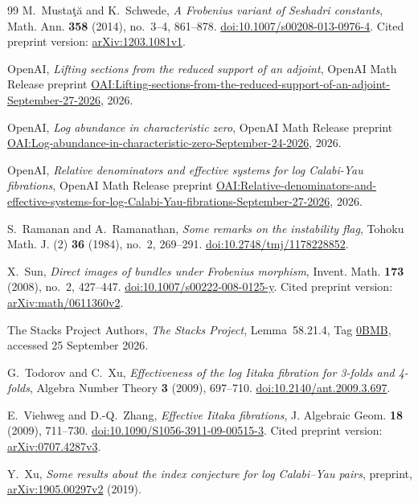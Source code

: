 \begin{thebibliography}{99}
M.~Musta\c{t}\u{a} and K.~Schwede,
\emph{A Frobenius variant of Seshadri constants},
Math. Ann. \textbf{358} (2014), no.~3--4, 861--878.
\href{https://doi.org/10.1007/s00208-013-0976-4}{doi:10.1007/s00208-013-0976-4}.
Cited preprint version:
\href{https://arxiv.org/abs/1203.1081v1}{arXiv:1203.1081v1}.

OpenAI,
\emph{Lifting sections from the reduced support of an adjoint},
OpenAI Math Release preprint
\href{https://github.com/openai/math/blob/main/preprints/Lifting-sections-from-the-reduced-support-of-an-adjoint-September-27-2026/paper.pdf}{OAI:Lifting-sections-from-the-reduced-support-of-an-adjoint-September-27-2026},
2026.

OpenAI,
\emph{Log abundance in characteristic zero},
OpenAI Math Release preprint
\href{https://github.com/openai/math/blob/main/preprints/Log-abundance-in-characteristic-zero-September-24-2026/paper.pdf}{OAI:Log-abundance-in-characteristic-zero-September-24-2026},
2026.

OpenAI,
\emph{Relative denominators and effective systems for log Calabi-Yau fibrations},
OpenAI Math Release preprint
\href{https://github.com/openai/math/blob/main/preprints/Relative-denominators-and-effective-systems-for-log-Calabi-Yau-fibrations-September-27-2026/paper.pdf}{OAI:Relative-denominators-and-effective-systems-for-log-Calabi-Yau-fibrations-September-27-2026},
2026.

S.~Ramanan and A.~Ramanathan,
\emph{Some remarks on the instability flag},
Tohoku Math. J. (2) \textbf{36} (1984), no.~2, 269--291.
\href{https://doi.org/10.2748/tmj/1178228852}{doi:10.2748/tmj/1178228852}.

X.~Sun,
\emph{Direct images of bundles under Frobenius morphism},
Invent. Math. \textbf{173} (2008), no.~2, 427--447.
\href{https://doi.org/10.1007/s00222-008-0125-y}{doi:10.1007/s00222-008-0125-y}.
Cited preprint version:
\href{https://arxiv.org/abs/math/0611360v2}{arXiv:math/0611360v2}.

The Stacks Project Authors,
\emph{The Stacks Project},
Lemma~58.21.4, Tag
\href{https://stacks.math.columbia.edu/tag/0BMB}{0BMB},
accessed 25 September 2026.

G.~Todorov and C.~Xu, \emph{Effectiveness of the log Iitaka fibration
for 3-folds and 4-folds}, Algebra Number Theory \textbf{3} (2009),
697--710. \href{https://doi.org/10.2140/ant.2009.3.697}{doi:10.2140/ant.2009.3.697}.

E.~Viehweg and D.-Q.~Zhang, \emph{Effective Iitaka fibrations},
J. Algebraic Geom. \textbf{18} (2009), 711--730.
\href{https://doi.org/10.1090/S1056-3911-09-00515-3}{doi:10.1090/S1056-3911-09-00515-3}.
Cited preprint version:
\href{https://arxiv.org/abs/0707.4287v3}{arXiv:0707.4287v3}.

Y.~Xu,
\emph{Some results about the index conjecture for log Calabi--Yau pairs},
preprint, \href{https://arxiv.org/abs/1905.00297v2}{arXiv:1905.00297v2}
(2019).

\end{thebibliography}
